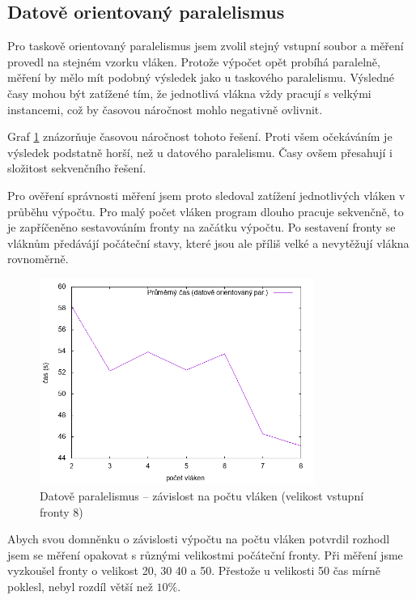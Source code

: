 \documentclass[czech]{article}
\begin{document}
\subsection{Datově orientovaný paralelismus}

Pro taskově orientovaný paralelismus jsem zvolil stejný vstupní soubor a měření provedl na stejném vzorku vláken.
Protože výpočet opět probíhá paralelně, měření by mělo mít podobný výsledek jako u taskového paralelismu.
Výsledné časy mohou být zatížené tím, že jednotlivá vlákna vždy pracují s velkými instancemi, což by časovou náročnost mohlo negativně ovlivnit.

Graf \ref{fig:data} znázorňuje časovou náročnost tohoto řešení.
Proti všem očekáváním je výsledek podstatně horší, než u datového paralelismu.
Časy ovšem přesahují i složitost sekvenčního řešení.

Pro ověření správnosti měření jsem proto sledoval zatížení jednotlivých vláken v průběhu výpočtu.
Pro malý počet vláken program dlouho pracuje sekvenčně, to je zapříčeněno sestavováním fronty na začátku výpočtu.
Po sestavení fronty se vláknům předávájí počáteční stavy, které jsou ale příliš velké a nevytěžují vlákna rovnoměrně.

\begin{figure}[H]
    \centering
    \includegraphics[width=0.8\textwidth]{assets/parallel-data-oriented.png}
    \caption{Datově paralelismus -- závislost na počtu vláken (velikost vstupní fronty 8)}
    \label{fig:data}
\end{figure}

Abych svou domněnku o závislosti výpočtu na počtu vláken potvrdil rozhodl jsem se měření opakovat s různými velikostmi počáteční fronty.
Při měření jsme vyzkoušel fronty o velikost 20, 30 40 a 50.
Přestože u velikosti 50 čas mírně poklesl, nebyl rozdíl větší než $10\%$.
\end{document}
